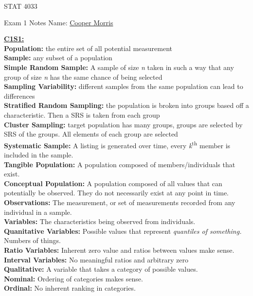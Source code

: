 \documentclass[letter, 12pt]{article}
\begin{document}
\begin{center}
STAT 4033
\end{center}
Exam 1 Notes \hfill Name: \uline{Cooper Morris}
\begin{multicols}{2}
\textbf{\uline{C1S1:}}\\
\textbf{Population:} the entire set of all potential measurement\\
\textbf{Sample:} any subset of a population\\
\textbf{Simple Random Sample:} A sample of size \textit{n} taken in such a way that any group of size \textit{n} has the same chance of being selected\\
\textbf{Sampling Variability:} different samples from the same population can lead to differences\\
\textbf{Stratified Random Sampling:} the population is broken into groups based off a characteristic. Then a SRS is taken from each group\\
\textbf{Cluster Sampling:} target population has many groups, groups are selected by SRS of the groups. All elements of each group are selected\\
\textbf{Systematic Sample:} A listing is generated over time, every \textit{k}\textsuperscript{th} member is included in the sample.\\
\textbf{Tangible Population:} A population composed of members/individuals that exist.\\
\textbf{Conceptual Population:} A population composed of all values that can potentially be observed. They do not necessarily exist at any point in time.\\
\textbf{Observations:} The measurement, or set of measurements recorded from any individual in a sample.\\
\textbf{Variables:} The characteristics being observed from individuals.\\
\textbf{Quanitative Variables:} Possible values that represent \textit{quantiles of something.} Numbers of things.\\
\textbf{Ratio Variables:} Inherent zero value and ratios between values make sense.\\
\textbf{Interval Variables:} No meaningful ratios and arbitrary zero \\
\textbf{Qualitative:} A variable that takes a category of possible values.\\
\textbf{Nominal:} Ordering of categories makes sense.\\
\textbf{Ordinal:} No inherent ranking in categories.\\

\end{multicols}
\end{document}
